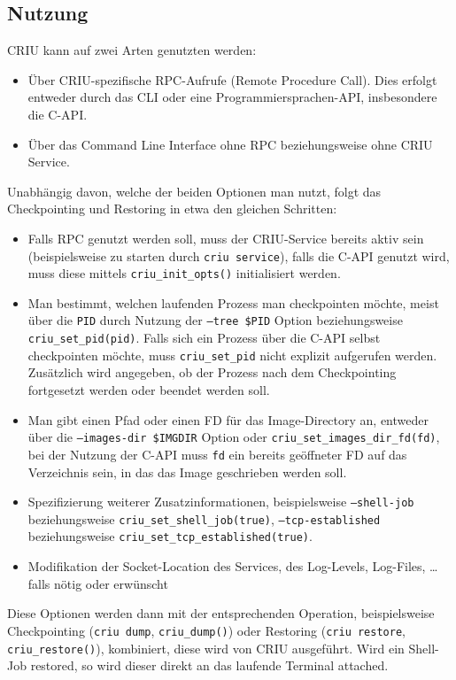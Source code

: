 \documentclass[a4paper]{article}
\begin{document}
\subsection{Nutzung}
CRIU kann auf zwei Arten genutzten werden:
\begin{itemize}
    \item Über CRIU-spezifische RPC-Aufrufe (Remote Procedure Call). Dies erfolgt entweder durch das CLI oder eine Programmiersprachen-API, insbesondere die C-API.
    \item Über das Command Line Interface ohne RPC beziehungsweise ohne CRIU Service.
\end{itemize}
Unabhängig davon, welche der beiden Optionen man nutzt, folgt das Checkpointing und Restoring in etwa den gleichen Schritten:
\begin{itemize}
    \item Falls RPC genutzt werden soll, muss der CRIU-Service bereits aktiv sein (beispielsweise zu starten durch \texttt{criu service}), falls die C-API genutzt wird, muss diese mittels \texttt{criu\_init\_opts()} initialisiert werden.
    \item Man bestimmt, welchen laufenden Prozess man checkpointen möchte, meist über die \texttt{PID} durch Nutzung der \texttt{--tree \$PID} Option beziehungsweise \texttt{criu\_set\_pid(pid)}. Falls sich ein Prozess über die C-API selbst checkpointen möchte, muss \texttt{criu\_set\_pid} nicht explizit aufgerufen werden. Zusätzlich wird angegeben, ob der Prozess nach dem Checkpointing fortgesetzt werden oder beendet werden soll.
    \item Man gibt einen Pfad oder einen FD für das Image-Directory an, entweder über die \texttt{--images-dir \$IMGDIR} Option oder \texttt{criu\_set\_images\_dir\_fd(fd)}, bei der Nutzung der C-API muss \texttt{fd} ein bereits geöffneter FD auf das Verzeichnis sein, in das das Image geschrieben werden soll.
    \item Spezifizierung weiterer Zusatzinformationen, beispielsweise \texttt{--shell-job} beziehungsweise \texttt{criu\_set\_shell\_job(true)}, \texttt{--tcp-established} beziehungsweise \texttt{criu\_set\_tcp\_established(true)}.
    \item Modifikation der Socket-Location des Services, des Log-Levels, Log-Files, \dots falls nötig oder erwünscht
\end{itemize}
Diese Optionen werden dann mit der entsprechenden Operation, beispielsweise Checkpointing (\texttt{criu dump}, \texttt{criu\_dump()}) oder Restoring (\texttt{criu restore}, \texttt{criu\_restore()}), kombiniert, diese wird von CRIU ausgeführt. Wird ein Shell-Job restored, so wird dieser direkt an das laufende Terminal attached.
\end{document}
